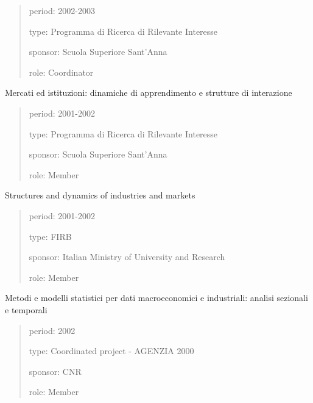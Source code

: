 \documentclass[a4paper]{article}
\newenvironment{DUfieldlist}%
    {\quote\description}
    {\enddescription\endquote}
\begin{document}
\begin{quote}
\begin{DUfieldlist}
\item[{period:}]
2002-2003

\item[{type:}]
Programma di Ricerca di Rilevante Interesse

\item[{sponsor:}]
Scuola Superiore Sant'Anna

\item[{role:}]
Coordinator
\end{DUfieldlist}
\end{quote}

Mercati ed istituzioni: dinamiche di apprendimento e strutture di
interazione

\begin{quote}
\begin{DUfieldlist}
\item[{period:}]
2001-2002

\item[{type:}]
Programma di Ricerca di Rilevante Interesse

\item[{sponsor:}]
Scuola Superiore Sant'Anna

\item[{role:}]
Member
\end{DUfieldlist}
\end{quote}

Structures and dynamics of industries and markets

\begin{quote}
\begin{DUfieldlist}
\item[{period:}]
2001-2002

\item[{type:}]
FIRB

\item[{sponsor:}]
Italian Ministry of University and Research

\item[{role:}]
Member
\end{DUfieldlist}
\end{quote}

Metodi e modelli statistici per dati macroeconomici e industriali:
analisi sezionali e temporali

\begin{quote}
\begin{DUfieldlist}
\item[{period:}]
2002

\item[{type:}]
Coordinated project - AGENZIA 2000

\item[{sponsor:}]
CNR

\item[{role:}]
Member
\end{DUfieldlist}
\end{quote}
\end{document}
